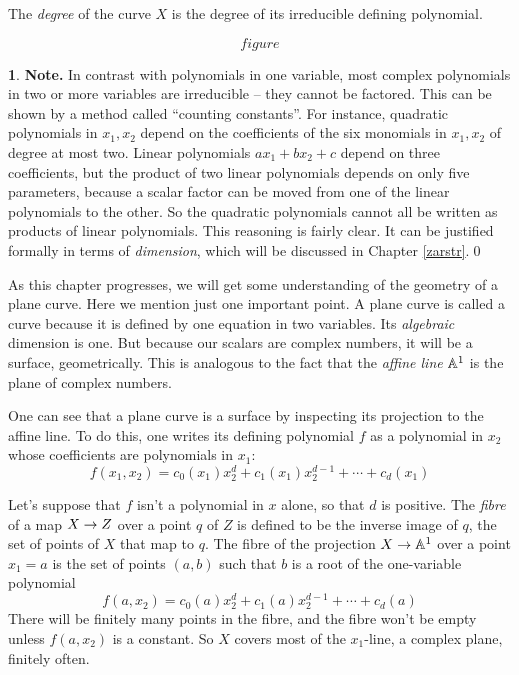 \documentclass[leqno]{book}
\newcommand\Marginnote[1]{\marginnote{\hspace{-12pt}\normalfont{#1}}}
\theoremstyle{definition}%
\numberwithin{equation}{section}
\newtheorem{note}[equation]{}
\theoremstyle{theorem} %
\begin{document}
\no
The {\it degree} of the curve $X$ is the degree of its
irreducible defining polynomial. 

$$figure$$



\ms
\begin{note}{\bf Note.}  \Marginnote{polyirred}
In contrast with polynomials in one variable, most complex polynomials
in two or more variables are irreducible -- they cannot be factored.
This can be shown by a method called ``counting constants''.  For
instance, quadratic polynomials in $x_1,x_2$ depend on the
coefficients of the six monomials in $x_1,x_2$ of degree at most two.
Linear polynomials $ax_1\!+\!bx_2\!+\!c$ depend on three coefficients,
but the product of two linear polynomials depends on only five
parameters, because a scalar factor can be moved from one of the
linear polynomials to the other.  So the quadratic polynomials cannot
all be written as products of linear polynomials.  This reasoning is
fairly clear.  It can be justified formally in terms of {\it
  dimension}, which will be discussed in Chapter \ref{zarstr}.\qed
\label{polyirred}\end{note}

As this chapter progresses, we will get some understanding of the
geometry of a plane curve. Here we mention just one important point.
A plane curve is called a curve because it is defined by one
equation in two variables.  Its {\it algebraic} dimension is one.  But
because our scalars are complex numbers, it will be a surface,
geometrically.  This is analogous to the fact that the {\it affine
  line} $\mathbb{A}^1$ is the plane of complex numbers.

One can see that a plane curve is a surface by inspecting its
projection to the affine line.  To do this, one writes its defining
polynomial $f$ as a polynomial in $x_2$ whose coefficients are
polynomials in $x_1$:
$$f(x_1,x_2) = c_0(x_1)x_2^d + c_1(x_1)x_2^{d-1} + \cdots + c_d(x_1)$$

\no Let's suppose that $f$ isn't a polynomial in $x$ alone, so that
$d$ is positive.  The {\it fibre} of a map $X \rightarrow Z$ over a point $q$
of $Z$ is defined to be the inverse image of $q$, the set of points of
$X$ that map to $q$.  The fibre of the projection $X \rightarrow \mathbb{A}^1$ over
a point $x_1 = a$ is the set of points $(a,b)$ such that $b$ is a root
of the one-variable polynomial $$f(a,x_2) = c_0(a)x_2^d +
c_1(a)x_2^{d-1} + \cdots + c_d(a)$$ There will be finitely many points
in the fibre, and the fibre won't be empty unless $f(a,x_2)$ is a
constant.  So $X$ covers most of the $x_1$-line, a complex plane,
finitely often.
\end{document}
